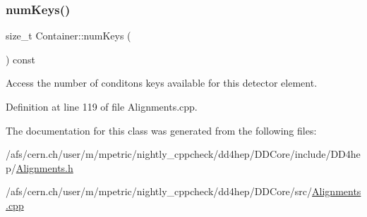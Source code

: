 \subsubsection{\texorpdfstring{num\+Keys()}{numKeys()}}
{\footnotesize\ttfamily size\+\_\+t Container\+::num\+Keys (\begin{DoxyParamCaption}{ }\end{DoxyParamCaption}) const}



Access the number of conditons keys available for this detector element. 



Definition at line 119 of file Alignments.\+cpp.



The documentation for this class was generated from the following files\+:\begin{DoxyCompactItemize}
\item 
/afs/cern.\+ch/user/m/mpetric/nightly\+\_\+cppcheck/dd4hep/\+D\+D\+Core/include/\+D\+D4hep/\hyperlink{_alignments_8h}{Alignments.\+h}\item 
/afs/cern.\+ch/user/m/mpetric/nightly\+\_\+cppcheck/dd4hep/\+D\+D\+Core/src/\hyperlink{_alignments_8cpp}{Alignments.\+cpp}\end{DoxyCompactItemize}
